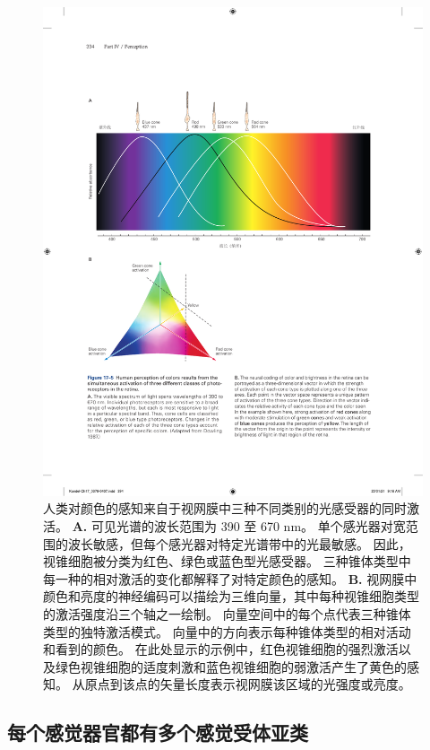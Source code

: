 \begin{figure}[htbp]
	\centering
	\includegraphics[width=1.0\linewidth]{chap17/fig_17_5}
	\caption{人类对颜色的感知来自于视网膜中三种不同类别的光感受器的同时激活。 
		\textbf{A.} 可见光谱的波长范围为 390 至 670 nm。 
		单个感光器对宽范围的波长敏感，但每个感光器对特定光谱带中的光最敏感。 
		因此，视锥细胞被分类为红色、绿色或蓝色型光感受器。 
		三种锥体类型中每一种的相对激活的变化都解释了对特定颜色的感知\cite{dowling1987retina}。
		\textbf{B.} 视网膜中颜色和亮度的神经编码可以描绘为三维向量，其中每种视锥细胞类型的激活强度沿三个轴之一绘制。 
		向量空间中的每个点代表三种锥体类型的独特激活模式。 
		向量中的方向表示每种锥体类型的相对活动和看到的颜色。 
		在此处显示的示例中，红色视锥细胞的强烈激活以及绿色视锥细胞的适度刺激和蓝色视锥细胞的弱激活产生了黄色的感知。 
		从原点到该点的矢量长度表示视网膜该区域的光强度或亮度。}
	\label{fig:17_5}
\end{figure}


\subsection{每个感觉器官都有多个感觉受体亚类}

